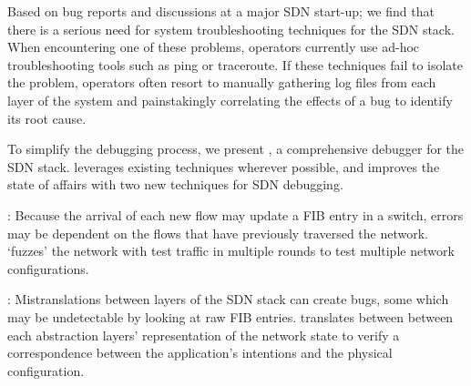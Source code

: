 
Based on bug reports and discussions at a major SDN start-up; we find that
there is a serious need for system troubleshooting techniques for the SDN
stack. When encountering one of these problems,
operators currently use ad-hoc troubleshooting tools such as ping or traceroute.
If these techniques fail to isolate the problem, operators often resort to
manually gathering log files from each layer of the system and painstakingly
correlating the effects of a bug to identify its root cause.

To simplify the debugging process, we present \projectname{}, a comprehensive debugger for the SDN stack.
\projectname{} leverages existing techniques wherever possible, and improves the state of affairs
with two new techniques for SDN debugging.


:  Because the arrival of each new flow may update a FIB entry in a switch,
 errors may be dependent on the flows that have previously traversed the network. \projectname{} `fuzzes' the network with 
test traffic in multiple rounds to test multiple network configurations.

: Mistranslations between layers of the SDN stack can create bugs, some which
may be undetectable by looking at raw FIB entries. \projectname{}
translates between between each abstraction layers' representation of the
network state to verify a correspondence between the application's intentions
and the physical configuration.

